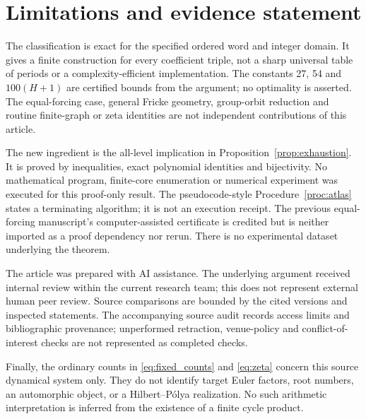 \section{Limitations and evidence statement}\label{sec:scope}

The classification is exact for the specified ordered word and integer
domain. It gives a finite construction for every coefficient triple,
not a sharp universal table of periods or a complexity-efficient
implementation. The constants 27, 54 and \(100(H+1)\) are certified
bounds from the argument; no optimality is asserted. The equal-forcing
case, general Fricke geometry, group-orbit reduction and routine
finite-graph or zeta identities are not independent contributions of
this article.

The new ingredient is the all-level implication in
Proposition~\ref{prop:exhaustion}. It is proved by inequalities,
exact polynomial identities and bijectivity. No mathematical program,
finite-core enumeration or numerical experiment was executed for this
proof-only result. The pseudocode-style Procedure~\ref{proc:atlas}
states a terminating algorithm; it is not an execution receipt. The
previous equal-forcing manuscript's computer-assisted certificate is
credited but is neither imported as a proof dependency nor rerun.
There is no experimental dataset underlying the theorem.

The article was prepared with AI assistance. The underlying argument
received internal review within the current research team; this does
not represent external human peer review. Source comparisons are
bounded by the cited versions and inspected statements. The accompanying
source audit records access limits and bibliographic provenance;
unperformed retraction, venue-policy and conflict-of-interest checks
are not represented as completed checks.

Finally, the ordinary counts in \eqref{eq:fixed_counts} and
\eqref{eq:zeta} concern this source dynamical system only. They do not
identify target Euler factors, root numbers, an automorphic object,
or a Hilbert--P\'olya realization. No such arithmetic interpretation
is inferred from the existence of a finite cycle product.
